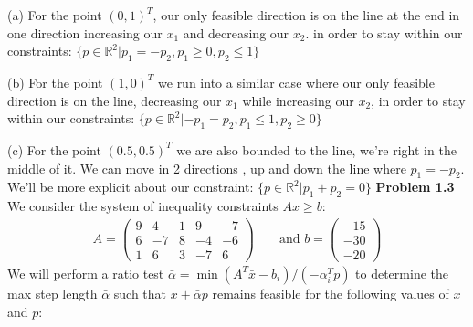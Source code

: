 \documentclass{article}
\begin{document}
\noindent(a) For the point $(0,1)^T$, our only feasible direction is on the line at the end in one direction increasing our $x_1$ and decreasing our $x_2$. in order to stay within our constraints: \newline $\{p \in \mathbb{R}^2 | p_1 = -p_2, p_1 \geq 0, p_2 \leq 1\}$ 

\noindent(b) For the point $(1,0)^T$ we run into a similar case where our only feasible direction is on the line, decreasing our $x_1$ while increasing our $x_2$, in order to stay within our constraints: \newline $\{p \in \mathbb{R}^2 | -p_1 = p_2, p_1 \leq 1, p_2 \geq 0\}$

\noindent(c) For the point $(0.5,0.5)^T$ we are also bounded to the line, we're right in the middle of it. We can move in 2 directions , up and down the line where $p_1 = -p_2$. We'll be more explicit about our constraint: $\{p \in \mathbb{R}^2 | p_1 + p_2 = 0\}$
\newline
\newline
\textbf{Problem 1.3} We consider the system of inequality constraints $Ax \geq b$:
\begin{align*}
    A =
    \begin{pmatrix}
        9 & 4 & 1 & 9 & -7 \\
        6 & -7 & 8 & -4 & -6 \\ 
        1 & 6 & 3 & -7 & 6
    \end{pmatrix} && 
    \text{ and }
    b =
    \begin{pmatrix}
        -15 \\ -30 \\ -20
    \end{pmatrix}
\end{align*} We will perform a ratio test $\bar{\alpha} = \min(A^T\bar{x} - b_i) / (-\alpha_i^T p)$ to determine the max step length $\bar{\alpha}$ such that $x + \bar{\alpha} p$ remains feasible for the following values of $x$ and $p$:
\end{document}
